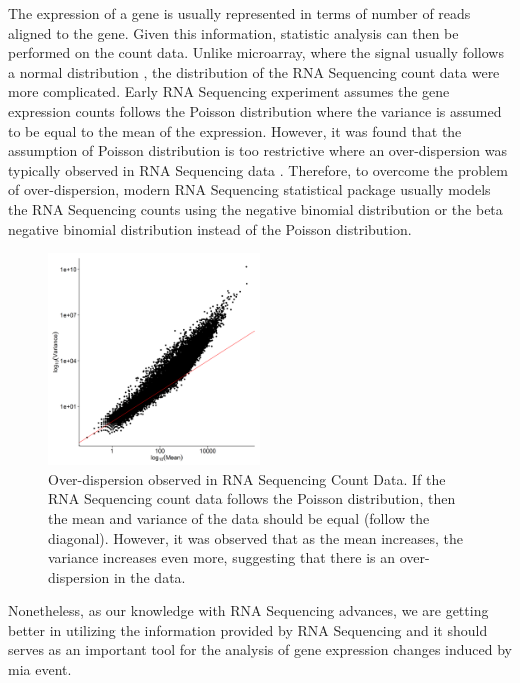 	The expression of a gene is usually represented in terms of number of reads aligned to the gene. 
	Given this information, statistic analysis can then be performed on the count data. 
	Unlike microarray, where the signal usually follows a normal distribution \citep{Hoyle2002,Giles2003}, the distribution of the RNA Sequencing count data were more complicated.
	Early RNA Sequencing experiment assumes the gene expression counts follows the Poisson distribution \citep{Marioni2008} where the variance is assumed to be equal to the mean of the expression.
	However, it was found that the assumption of Poisson distribution is too restrictive where an over-dispersion was typically observed in RNA Sequencing data \citep{Anders2010}.
	Therefore, to overcome the problem of over-dispersion, modern RNA Sequencing statistical package usually models the RNA Sequencing counts using the negative binomial distribution \citep{Anders2010,Robinson2010} or the beta negative binomial distribution \citep{Trapnell2012} instead of the Poisson distribution.
	\begin{figure}
		\centering
		\includegraphics[width=0.5\textwidth]{figure/overdispersion.png}
		\caption[Over-dispersion observed in RNA Sequencing Count Data]{
			Over-dispersion observed in RNA Sequencing Count Data.
			If the RNA Sequencing count data follows the Poisson distribution, then the mean and variance of the data should be equal (follow the diagonal). 
			However, it was observed that as the mean increases, the variance increases even more, suggesting that there is an over-dispersion in the data. 
		}
	\end{figure}
	
	Nonetheless, as our knowledge with RNA Sequencing advances, we are getting better in utilizing the information provided by RNA Sequencing and it should serves as an important tool for the analysis of gene expression changes induced by \gls{mia} event.
	
